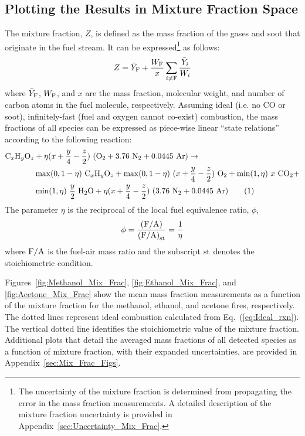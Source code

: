 \documentclass[12pt]{article}
\newcommand\numberthis{\addtocounter{equation}{1}\tag{\theequation}}
\begin{document}
\subsection{Plotting the Results in Mixture Fraction Space}
\label{ssec:Mixture_Fraction_Results}

The mixture fraction, $Z$, is defined as the mass fraction of the gases and soot that originate in the fuel stream. It can be expressed\footnote{The uncertainty of the mixture fraction is determined from propagating the error in the mass fraction measurements. A detailed description of the mixture fraction uncertainty is provided in Appendix~\ref{sec:Uncertainty_Mix_Frac}.} as follows:
\begin{equation}\label{eq:Mixture_Fraction}
  Z = \bar{Y}_{\rm F} + \frac{W_{\rm F}}{x} \sum_{i\ne {\rm F}} \frac{\bar{Y}_i}{W_{i}}
\end{equation}
where $\bar{Y}_{\rm F}$, ${W_{\rm F}}$, and $x$ are the mass fraction, molecular weight, and number of carbon atoms in the fuel molecule, respectively. Assuming ideal (i.e. no CO or soot), infinitely-fast (fuel and oxygen cannot co-exist) combustion, the mass fractions of all species can be expressed as piece-wise linear ``state relations'' according to the following reaction:
\begin{align*}
{\rm C}_{x}{\rm H}_{y}{\rm O}_{z} & +\eta(x+\frac{y}{4}-\frac{z}{2})~({\rm O}_{2}+3.76~{\rm N}_{2}+0.0445~{\rm Ar}) \rightarrow  \\
          & \max(0,1-\eta)~{\rm C}_{x}{\rm H}_{y}{\rm O}_{z}+\max(0,1-\eta)~(x+\frac{y}{4}-\frac{z}{2})~{\rm O}_{2}+ \min(1,\eta)~x~{\rm CO}_{2} +  \\
          & \min(1,\eta)~\frac{y}{2}~{\rm H}_{2}{\rm O}+\eta(x+\frac{y}{4}-\frac{z}{2})~(3.76~{\rm N}_{2}+0.0445~{\rm Ar})  \numberthis \label{eq:Ideal_rxn}
\end{align*}
The parameter $\eta$ is the reciprocal of the local fuel equivalence ratio, $\phi$,
\begin{equation}\label{eq:Eta}
\phi=\frac{\rm (F/A)}{{\rm (F/A)}_{\rm st}}=\frac{1}{\eta}
\end{equation}
where $\rm F/A$ is the fuel-air mass ratio and the subscript $\rm st$ denotes the stoichiometric condition.

Figures~\ref{fig:Methanol_Mix_Frac}, \ref{fig:Ethanol_Mix_Frac}, and \ref{fig:Acetone_Mix_Frac} show the mean mass fraction measurements as a function of the mixture fraction for the methanol, ethanol, and acetone fires, respectively. The dotted lines represent ideal combustion calculated from Eq.~(\ref{eq:Ideal_rxn}). The vertical dotted line identifies the stoichiometric value of the mixture fraction. Additional plots that detail the averaged mass fractions of all detected species as a function of mixture fraction, with their expanded uncertainties, are provided in Appendix~\ref{sec:Mix_Frac_Figs}.
\end{document}
